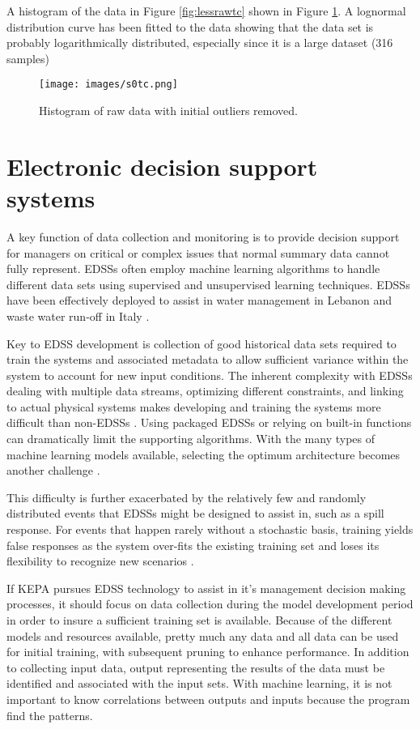 A histogram of the data in Figure \ref{fig:lessrawtc} shown in Figure \ref{fig:histc}. A lognormal distribution curve has been fitted to the data showing that the data set is probably logarithmically distributed, especially since it is a large dataset (316 samples)

\begin{figure}[H]
\centering
\texttt{[image: images/s0tc.png]} 
\caption{Histogram of raw data with initial outliers removed.}
\label{fig:histc}
\end{figure}

\section{Electronic decision support systems}
A key function of data collection and monitoring is to provide decision support for managers on critical or complex issues that normal summary data cannot fully represent. EDSSs often employ machine learning algorithms to handle different data sets using supervised and unsupervised learning techniques. EDSSs have been effectively deployed to assist in water management in Lebanon \citep{Assaf2008}and waste water run-off in Italy \citep{Massei2014}.

Key to EDSS development is collection of good historical data sets required to train the systems and associated metadata to allow sufficient variance within the system to account for new input conditions. The inherent complexity with EDSSs dealing with multiple data streams, optimizing different constraints, and linking to actual physical systems makes developing and training the systems more difficult than non-EDSSs \citep{Swayne2000}. Using packaged EDSSs or relying on built-in functions can dramatically limit the supporting algorithms. With the many types of machine learning models available, selecting the optimum architecture becomes another challenge \citep{Massei2014}.

This difficulty is further exacerbated by the relatively few and randomly distributed events that EDSSs might be designed to assist in, such as a spill response. For events that happen rarely without a stochastic basis, training yields false responses as the system over-fits the existing training set and loses its flexibility to recognize new scenarios \citep{Goodfellow2016}.

If KEPA pursues EDSS technology to assist in it's management decision making processes, it should focus on data collection during the model development period in order to insure a sufficient training set is available. Because of the different models and resources available, pretty much any data and all data can be used for initial training, with subsequent pruning to enhance performance. In addition to collecting input data, output representing the results of the data must be identified and associated with the input sets. With machine learning, it is not important to know correlations between outputs and inputs because the program find the patterns.

